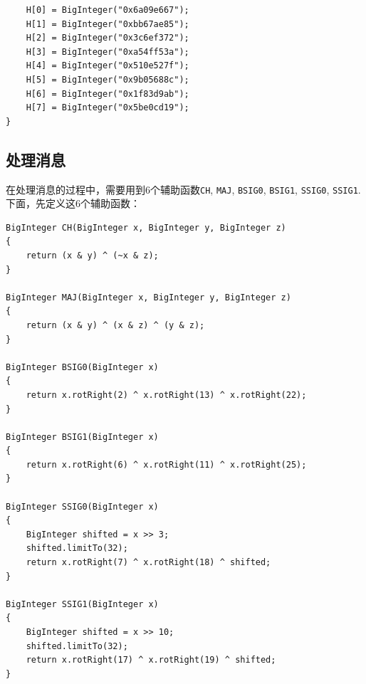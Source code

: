 \begin{prove}
\begin{verbatim}
    H[0] = BigInteger("0x6a09e667");
    H[1] = BigInteger("0xbb67ae85");
    H[2] = BigInteger("0x3c6ef372");
    H[3] = BigInteger("0xa54ff53a");
    H[4] = BigInteger("0x510e527f");
    H[5] = BigInteger("0x9b05688c");
    H[6] = BigInteger("0x1f83d9ab");
    H[7] = BigInteger("0x5be0cd19");
}
\end{verbatim}
\end{prove}
\subsection{处理消息}
在处理消息的过程中，需要用到6个辅助函数\verb`CH`, \verb`MAJ`, \verb`BSIG0`, \verb`BSIG1`, \verb`SSIG0`, \verb`SSIG1`. 下面，先定义这6个辅助函数：
\begin{prove}
\begin{verbatim}
BigInteger CH(BigInteger x, BigInteger y, BigInteger z)
{
    return (x & y) ^ (~x & z);
}

BigInteger MAJ(BigInteger x, BigInteger y, BigInteger z)
{
    return (x & y) ^ (x & z) ^ (y & z);
}

BigInteger BSIG0(BigInteger x)
{
    return x.rotRight(2) ^ x.rotRight(13) ^ x.rotRight(22);
}

BigInteger BSIG1(BigInteger x)
{
    return x.rotRight(6) ^ x.rotRight(11) ^ x.rotRight(25);
}

BigInteger SSIG0(BigInteger x)
{
    BigInteger shifted = x >> 3;
    shifted.limitTo(32);
    return x.rotRight(7) ^ x.rotRight(18) ^ shifted;
}

BigInteger SSIG1(BigInteger x)
{
    BigInteger shifted = x >> 10;
    shifted.limitTo(32);
    return x.rotRight(17) ^ x.rotRight(19) ^ shifted;
}
\end{verbatim}
\end{prove}

